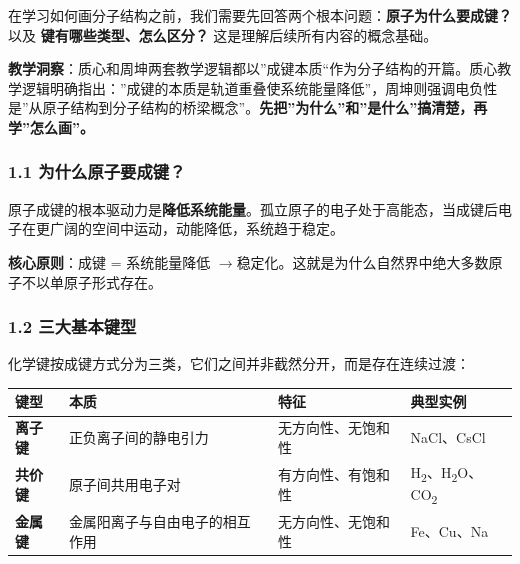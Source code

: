 \documentclass[a4paper,11pt]{ctexart}
\newcounter{none}
\newcommand{\箭}{\ensuremath{\rightarrow}}
\newcommand{\左箭}{\ensuremath{\leftarrow}}
\newcommand{\上箭}{\ensuremath{\uparrow}}
\newcommand{\下箭}{\ensuremath{\downarrow}}
\newcommand{\衡}{\ensuremath{\rightleftharpoons}}
\newcommand{\双箭}{\ensuremath{\leftrightarrow}}
\newcommand{\约等于}{\ensuremath{\approx}}
\newcommand{\小于等于}{\ensuremath{\leq}}
\newcommand{\大于等于}{\ensuremath{\geq}}
\newcommand{\不等于}{\ensuremath{\neq}}
\newcommand{\西格马}{\ensuremath{\sigma}}
\newcommand{\派}{\ensuremath{\pi}}
\begin{document}
在学习如何画分子结构之前，我们需要先回答两个根本问题：\textbf{原子为什么要成键？} 以及 \textbf{键有哪些类型、怎么区分？} 这是理解后续所有内容的概念基础。

\textbf{教学洞察}：质心和周坤两套教学逻辑都以''成键本质``作为分子结构的开篇。质心教学逻辑明确指出：''成键的本质是轨道重叠使系统能量降低''，周坤则强调电负性是''从原子结构到分子结构的桥梁概念''。\textbf{先把''为什么''和''是什么''搞清楚，再学''怎么画''。}

\subsubsection{1.1 为什么原子要成键？}\label{ux4e3aux4ec0ux4e48ux539fux5b50ux8981ux6210ux952e}

原子成键的根本驱动力是\textbf{降低系统能量}。孤立原子的电子处于高能态，当成键后电子在更广阔的空间中运动，动能降低，系统趋于稳定。

\textbf{核心原则}：成键 = 系统能量降低 \箭 稳定化。这就是为什么自然界中绝大多数原子不以单原子形式存在。

\subsubsection{1.2 三大基本键型}\label{ux4e09ux5927ux57faux672cux952eux578b}

化学键按成键方式分为三类，它们之间并非截然分开，而是存在连续过渡：

{\def\LTcaptype{none} %
\begin{longtable}[]{@{}
  >{\raggedright\arraybackslash}p{}
  >{\raggedright\arraybackslash}p{}
  >{\raggedright\arraybackslash}p{}
  >{\raggedright\arraybackslash}p{}@{}}
\toprule\noalign{}
\begin{minipage}[b]{\linewidth}\raggedright
键型
\end{minipage} & \begin{minipage}[b]{\linewidth}\raggedright
本质
\end{minipage} & \begin{minipage}[b]{\linewidth}\raggedright
特征
\end{minipage} & \begin{minipage}[b]{\linewidth}\raggedright
典型实例
\end{minipage} \\
\midrule\noalign{}
\endhead
\bottomrule\noalign{}
\endlastfoot
\textbf{离子键} & 正负离子间的静电引力 & 无方向性、无饱和性 & NaCl、CsCl \\
\textbf{共价键} & 原子间共用电子对 & 有方向性、有饱和性 & H\textsubscript{2}、H\textsubscript{2}O、CO\textsubscript{2} \\
\textbf{金属键} & 金属阳离子与自由电子的相互作用 & 无方向性、无饱和性 & Fe、Cu、Na \\
\end{longtable}
}
\end{document}
